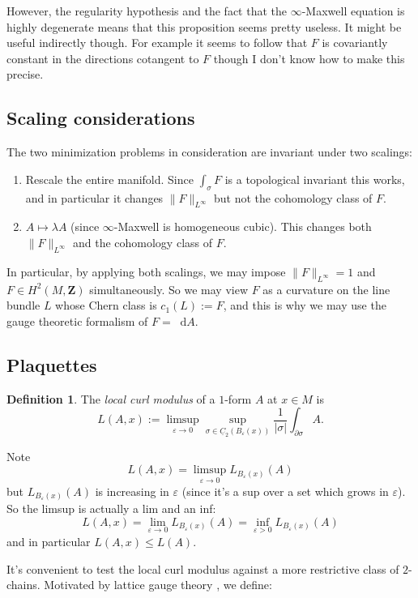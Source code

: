 \documentclass[reqno,11pt]{amsart}
\newcommand{\ZZ}{\mathbf{Z}}
\newcommand*\dif{\mathop{}\!\mathrm{d}}
\newcommand{\Chain}{\underline C}
\newcommand{\dfn}[1]{\emph{#1}\index{#1}}
\theoremstyle{definition}
\newtheorem{definition}[theorem]{Definition}
\numberwithin{equation}{section}
\begin{document}
However, the regularity hypothesis and the fact that the $\infty$-Maxwell equation is highly degenerate means that this proposition seems pretty useless.
It might be useful indirectly though.
For example it seems to follow that $F$ is covariantly constant in the directions cotangent to $F$ though I don't know how to make this precise.

\subsection{Scaling considerations}
The two minimization problems in consideration are invariant under two scalings: 
\begin{enumerate}
\item Rescale the entire manifold. Since $\int_\sigma F$ is a topological invariant this works, and in particular it changes $\|F\|_{L^\infty}$ but not the cohomology class of $F$.
\item $A \mapsto \lambda A$ (since $\infty$-Maxwell is homogeneous cubic). This changes both $\|F\|_{L^\infty}$ and the cohomology class of $F$.
\end{enumerate}
In particular, by applying both scalings, we may impose $\|F\|_{L^\infty} = 1$ and $F \in H^2(M, \ZZ)$ simultaneously.
So we may view $F$ as a curvature on the line bundle $L$ whose Chern class is $c_1(L) := F$, and this is why we may use the gauge theoretic formalism of $F = \dif A$.

\subsection{Plaquettes}
\begin{definition}
The \dfn{local curl modulus} of a $1$-form $A$ at $x \in M$ is 
$$L(A, x) := \limsup_{\varepsilon \to 0} \sup_{\sigma \in \Chain_2(B_\varepsilon(x))} \frac{1}{|\sigma|} \int_{\partial \sigma} A.$$
\end{definition}

Note 
$$L(A, x) = \limsup_{\varepsilon \to 0} L_{B_\varepsilon(x)}(A)$$
but $L_{B_\varepsilon(x)}(A)$ is increasing in $\varepsilon$ (since it's a sup over a set which grows in $\varepsilon$).
So the limsup is actually a lim and an inf:
$$L(A, x) = \lim_{\varepsilon \to 0} L_{B_\varepsilon(x)}(A) = \inf_{\varepsilon > 0} L_{B_\varepsilon(x)}(A)$$
and in particular $L(A, x) \leq L(A)$.

It's convenient to test the local curl modulus against a more restrictive class of $2$-chains.
Motivated by lattice gauge theory \cite{Gupta98}, we define:
\end{document}
